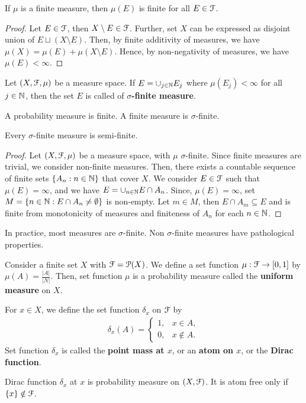 \documentclass[a4paper,english,12pt]{article}
\begin{document}
\begin{lem} If $\mu$ is a finite measure, then $\mu(E)$ is finite for all $E \in \mathcal{F}$.
\end{lem}
\begin{proof} Let $E \in \mathcal{F}$, then $X \setminus E \in \mathcal{F}$. Further, set $X$ can be expressed as disjoint union of  $E \sqcup (X \setminus E)$. Then, by finite additivity of measures, we have $\mu(X) = \mu(E) + \mu(X \setminus E)$. Hence, by non-negativity of measures, we have $\mu(E) < \infty$.
\end{proof}
\begin{defn} Let $(X,\mathcal{F},\mu)$ be a measure space. If $E = \cup_{j \in \mathbb{N}}E_j$ where $\mu(E_j) < \infty$ for all $j \in \mathbb{N}$, then the set $E$ is called of \textbf{$\sigma$-finite measure}.
\end{defn}
\begin{lem} A probability measure is finite. A finite measure is $\sigma$-finite.
\end{lem}
\begin{prop} Every $\sigma$-finite measure is semi-finite.%
\end{prop}
\begin{proof} 
Let $(X, \mathcal{F}, \mu)$ be a measure space, with $\mu$ $\sigma$-finite. Since finite measures are trivial, we consider non-finite measures. Then, there exists a countable sequence of finite sets $\{A_n: n \in \mathbb{N}\}$ that cover $X$. We consider $E \in \mathcal{F}$ such that $\mu(E) = \infty$, and we have $E = \cup_{n \in \mathbb{N}}E \cap A_n$. Since, $\mu(E) = \infty$, set $M = \{n \in \mathbb{N}: E \cap A_n \neq \emptyset \}$ is non-empty. Let $m \in M$, then $E \cap A_m \subseteq E$ and is finite from monotonicity of measures and finiteness of $A_n$ for each $n \in \mathbb{N}$.
\end{proof}
\begin{rem} In practice, most measures are $\sigma$-finite. Non $\sigma$-finite measures have pathological properties.
\end{rem}

\begin{defn} Consider a finite set $X$ with $\mathcal{F} = \mathcal{P}(X)$. We define a set function $\mu: \mathcal{F} \to [0,1]$ by $\mu(A) = \frac{|A|}{|N|}$. Then, set function $\mu$ is a probability measure called the \textbf{uniform measure} on $X$.
\end{defn}

\begin{defn} For $x \in X$, we define the set function $\delta_x$ on $\mathcal{F}$ by 
\begin{align*}
\delta_x(A) = \begin{cases}1, & x \in A,\\ 0, &x \notin A.\end{cases}
\end{align*} 
Set function $\delta_x$ is called the \textbf{point mass at $x$}, or an \textbf{atom on $x$}, or the \textbf{Dirac function}. 
\end{defn}
\begin{lem} Dirac function $\delta_x$ at $x$ is probability measure on $(X, \mathcal{F})$. It is atom free only if $\{x\} \notin \mathcal{F}$.
\end{lem}
\end{document}
